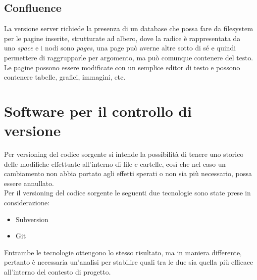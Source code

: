 \documentclass[a4paper, 12pt]{report}
\numberwithin{equation}{section}
\begin{document}
\subsection{Confluence}
La versione server richiede la presenza di un database che possa fare da filesystem per le pagine inserite, strutturate ad albero, dove la radice è rappresentata da uno \emph{space} e i nodi sono \emph{pages}, una page può averne altre sotto di sé e quindi permettere di raggrupparle per argomento, ma può comunque contenere del testo. Le pagine possono essere modificate con un semplice editor di testo e possono contenere tabelle, grafici, immagini, etc.

\section{Software per il controllo di versione}
Per versioning del codice sorgente si intende la possibilità di tenere uno storico delle modifiche effettuate all’interno di file e cartelle, così che nel caso un cambiamento non abbia portato agli effetti sperati o non sia più necessario, possa essere annullato.\\
Per il versioning del codice sorgente le seguenti due tecnologie sono state prese in considerazione:
\begin{itemize}
    \item Subversion 
    \item Git
\end{itemize}
Entrambe le tecnologie ottengono lo stesso risultato, ma in maniera differente, pertanto è necessaria un’analisi per stabilire quali tra le due sia quella più efficace all’interno del contesto di progetto.
\end{document}
